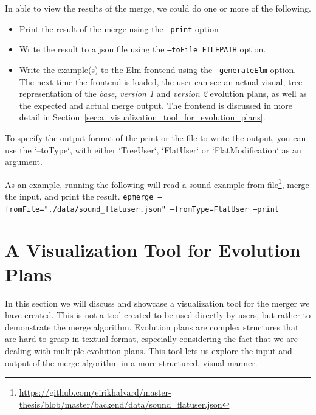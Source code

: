 \documentclass[a4paper,english]{ifimaster}
\begin{document}
In able to view the results of the merge, we could do one or more of the following.

\begin{itemize}
  \item Print the result of the merge using the \texttt{--print} option
  \item Write the result to a json file using the \texttt{--toFile FILEPATH} option.
  \item Write the example(s) to the Elm frontend using the \texttt{--generateElm} option. The next time the frontend is loaded, the user can see an actual visual, tree representation of the \textit{base}, \textit{version 1} and \textit{version 2} evolution plans, as well as the expected and actual merge output. The frontend is discussed in more detail in Section~\vref{sec:a_visualization_tool_for_evolution_plans}.
\end{itemize}

To specify the output format of the print or the file to write the output, you can use the `--toType`, with either `TreeUser`, `FlatUser` or `FlatModification` as an argument.

As an example, running the following will read a sound example from file\footnote{\url{https://github.com/eirikhalvard/master-thesis/blob/master/backend/data/sound\_flatuser.json}}, merge the input, and print the result. \texttt{epmerge --fromFile="./data/sound\_flatuser.json" --fromType=FlatUser --print}

\section{A Visualization Tool for Evolution Plans}%
\label{sec:a_visualization_tool_for_evolution_plans}

In this section we will discuss and showcase a visualization tool for the merger we have created. This is not a tool created to be used directly by users, but rather to demonstrate the merge algorithm. Evolution plans are complex structures that are hard to grasp in textual format, especially considering the fact that we are dealing with multiple evolution plans. This tool lets us explore the input and output of the merge algorithm in a more structured, visual manner.
\end{document}

